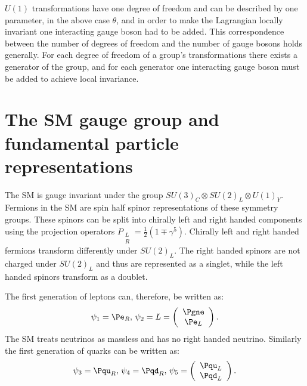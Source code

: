 $U(1)$ transformations have one degree of freedom and can be described by one parameter, in the above case $\theta$, and in order to make the Lagrangian locally invariant one interacting gauge boson had to be added. This correspondence between the number of degrees of freedom and the number of gauge bosons holds generally. For each degree of freedom of a group's transformations there exists a generator of the group, and for each generator one interacting gauge boson must be added to achieve local invariance.

\section{The SM gauge group and fundamental particle representations}
\label{sec:smgauge}
The SM is gauge invariant under the group $SU\left(3\right)_{C}\otimes SU\left(2\right)_{L}\otimes U\left(1\right)_{Y}$. Fermions in the SM are spin half spinor representations of these symmetry groups. These spinors can be split into chirally left and right handed components using the projection operators $P_{\substack{L \\R}}=\frac{1}{2}(1\mp \gamma^{5})$. Chirally left and right handed fermions transform differently under $SU\left(2\right)_{L}$. The right handed spinors are not charged under $SU\left(2\right)_{L}$ and thus are represented as a singlet, while the left handed spinors transform as a doublet.

The first generation of leptons can, therefore, be written as:
\begin{equation}
  \psi_{1}=\Pe_{R},\,\psi_{2}=L=\left(\begin{array}{c} \Pgne \\ \Pe_{L}\end{array}\right).
\end{equation}
The SM treats neutrinos as massless and has no right handed neutrino. Similarly the first generation of quarks can be written as:
\begin{equation}
  \psi_{3}=\Pqu_{R},\,\psi_{4}=\Pqd_{R},\,\psi_{5}=\left(\begin{array}{c} \Pqu_{L} \\ \Pqd_{L}\end{array}\right).
\end{equation}

